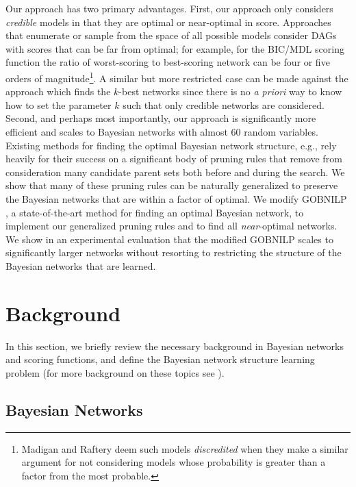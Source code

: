 \documentclass[letterpaper]{article}
\begin{document}
Our approach has two primary advantages. First, our approach
only considers \emph{credible } models in that they are
optimal or near-optimal in score. Approaches that enumerate
or sample from the space of all possible models consider DAGs
with scores that can be far from optimal; for example,
for the BIC/MDL scoring function the ratio of worst-scoring
to best-scoring network can be four or five orders of
magnitude\footnote{Madigan and Raftery 
deem such models \emph{discredited} when they make a similar
argument for not considering models whose probability is
greater than a factor from the most probable.}. A
similar but more restricted case can be made against the
approach which finds the $k$-best networks since there is no
\emph{a priori} way to know how to set the parameter $k$ such that only
credible  networks are considered. Second, and perhaps most
importantly, our approach is significantly more efficient and
scales to Bayesian networks with almost 60 random variables. Existing
methods for finding the optimal Bayesian network structure, e.g., \cite{BartlettC13,vanBeek2015}
rely heavily for their success on a significant body of
pruning rules that remove from consideration many candidate
parent sets both before and during the search. We show that many
of these pruning rules can be
naturally generalized to preserve the Bayesian networks that are
within a factor of optimal.
We modify GOBNILP \cite{BartlettC13}, a state-of-the-art method for finding
an optimal Bayesian network, to implement our generalized pruning rules
and to find all \emph{near}-optimal networks. We show in an experimental
evaluation that the modified GOBNILP scales to significantly
larger networks without resorting to restricting the structure of the Bayesian networks that are learned.

\section{Background}\label{sec:background}

In this section, we briefly review the necessary background in
Bayesian networks and scoring functions, and define the Bayesian network structure
learning problem (for more background on these topics see \cite{Darwiche09,KollerF09}).

\subsection{Bayesian Networks}
\end{document}
